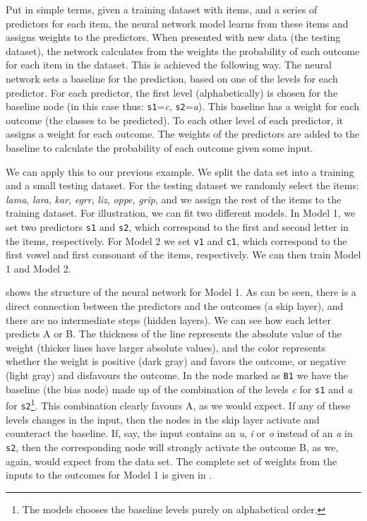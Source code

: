 Put in simple terms, given a training dataset with items, and a series of predictors for each item, the neural network model learns from these items and assigns weights to the predictors. When presented with new data (the testing dataset), the network calculates from the weights the probability of each outcome for each item in the dataset. This is achieved the following way. The neural network sets a baseline for the prediction, based on one of the levels for each predictor. For each predictor, the first level (alphabetically) is chosen for the baseline node (in this case thus: \texttt{s1}=\textit{c}, \texttt{s2}=\textit{a}). This baseline has a weight for each outcome (the classes to be predicted). To each other level of each predictor, it assigns a weight for each outcome. The weights of the predictors are added to the baseline to calculate the probability of each outcome given some input.

We can apply this to our previous example. We split the data set into a training and a small testing dataset. For the testing dataset we randomly select the items: \textit{lama}, \textit{lara}, \textit{kar}, \textit{egrr}, \textit{liz}, \textit{oppe}, \textit{grip}, and we assign the rest of the items to the training dataset. For illustration, we can fit two different models. In Model 1, we set two predictors \texttt{s1} and \texttt{s2}, which correspond to the first and second letter in the items, respectively. For Model 2 we set \texttt{v1} and \texttt{c1}, which correspond to the first vowel and first consonant of the items, respectively. We can then train Model 1 and Model 2.

 shows the structure of the neural network for Model 1. As can be seen, there is a direct connection between the predictors and the outcomes (a skip layer), and there are no intermediate steps (hidden layers). We can see how each letter predicts A or B. The thickness of the line represents the absolute value of the weight (thicker lines have larger absolute values), and the color represents whether the weight is positive (dark gray) and favors the outcome, or negative (light gray) and disfavours the outcome. In the node marked as \texttt{B1} we have the baseline (the bias node) made up of the combination of the levels \textit{c} for \texttt{s1} and \textit{a} for \texttt{s2}\footnote{The models chooses the baseline levels purely on alphabetical order.}. This combination clearly favours A, as we would expect. If any of these levels changes in the input, then the nodes in the skip layer activate and counteract the baseline. If, say, the input contains an \textit{u}, \textit{i} or \textit{o} instead of an \textit{a} in \texttt{s2}, then the corresponding node will strongly activate the outcome B, as we, again, would expect from the data set. The complete set of weights from the inputs to the outcomes for Model 1 is given in .

